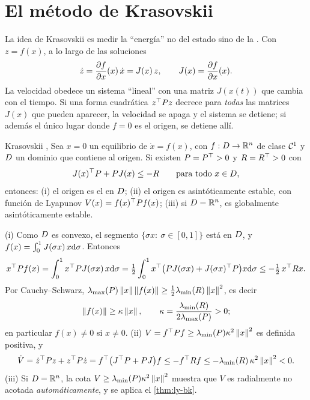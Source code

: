 \section{El método de Krasovskii}
\label{sec:iv-krasovskii}

La idea de Krasovskii es medir la ``energía'' no del estado sino de la . Con $z=f(x)$, a lo largo de las soluciones
\[
  \dot z=\frac{\partial f}{\partial x}(x)\,\dot x=J(x)\,z,\qquad J(x)=\frac{\partial f}{\partial x}(x) .
\]
La velocidad obedece un sistema ``lineal'' con una matriz $J(x(t))$ que cambia con el tiempo. Si una forma cuadrática $z^{\top} Pz$ decrece para \emph{todas} las matrices $J(x)$ que pueden aparecer, la velocidad se apaga y el sistema se detiene; si además el único lugar donde $f=0$ es el origen, se detiene allí.

\begin{teorema}[label=thm:iv-krasovskii]{Krasovskii \citep{Kra63}, \citep[ej.~4.10]{Kha02}}
Sea $x=0$ un equilibrio de $\dot x=f(x)$, con $f:D\to\mathbb{R}^n$ de clase $\mathcal{C}^{1}$ y $D$ un dominio  que contiene al origen. Si existen $P=P^{\top}>0$ y $R=R^{\top}>0$ con
\begin{equation}
  J(x)^{\top} P+PJ(x)\le-R\qquad\text{para todo }x\in D,
  \label{eq:iv-krasovskii}
\end{equation}
entonces: (i) el origen es el  en $D$; (ii) el origen es asintóticamente estable, con función de Lyapunov $V(x)=f(x)^{\top} Pf(x)$; (iii) si $D=\mathbb{R}^n$, es globalmente asintóticamente estable.
\end{teorema}

\begin{demostracion}
(i) Como $D$ es convexo, el segmento $\{\sigma x:\ \sigma\in[0,1]\}$ está en $D$, y $f(x)=\int_0^1J(\sigma x)\,x\mathrm{d}\sigma$. Entonces
\[
  x^{\top} Pf(x)=\int_0^1x^{\top} PJ(\sigma x)\,x\mathrm{d}\sigma=\tfrac12\int_0^1x^{\top}\bigl(PJ(\sigma x)+J(\sigma x)^{\top} P\bigr)x\mathrm{d}\sigma\le-\tfrac12\,x^{\top} Rx .
\]
Por Cauchy--Schwarz, $\lambda_{\max}(P)\left\lVert x\right\rVert\left\lVert f(x)\right\rVert\ge\tfrac12\lambda_{\min}(R)\left\lVert x\right\rVert^2$, es decir
\[
  \left\lVert f(x)\right\rVert\ge\kappa\left\lVert x\right\rVert,\qquad \kappa=\frac{\lambda_{\min}(R)}{2\lambda_{\max}(P)}>0 ;
\]
en particular $f(x)\neq0$ si $x\neq0$. (ii) $V=f^{\top} Pf\ge\lambda_{\min}(P)\kappa^2\left\lVert x\right\rVert^2$ es definida positiva, y
\[
  \dot V=\dot z^{\top} Pz+z^{\top} P\dot z=f^{\top}\bigl(J^{\top} P+PJ\bigr)f\le-f^{\top} Rf\le-\lambda_{\min}(R)\,\kappa^2\left\lVert x\right\rVert^2<0 .
\]
(iii) Si $D=\mathbb{R}^n$, la cota $V\ge\lambda_{\min}(P)\kappa^2\left\lVert x\right\rVert^2$ muestra que $V$ es radialmente no acotada \emph{automáticamente}, y se aplica el \cref{thm:ly-bk}.
\end{demostracion}

